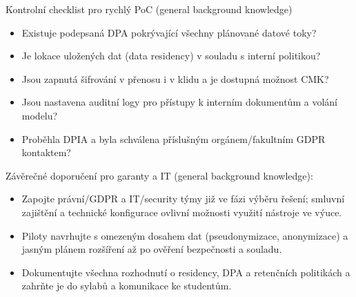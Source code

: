 Kontrolní checklist pro rychlý PoC (general background knowledge)
\begin{itemize}
  \item Existuje podepsaná DPA pokrývající všechny plánované datové toky?
  \item Je lokace uložených dat (data residency) v souladu s interní politikou?
  \item Jsou zapnutá šifrování v přenosu i v klidu a je dostupná možnost CMK?
  \item Jsou nastavena auditní logy pro přístupy k interním dokumentům a volání modelu?
  \item Proběhla DPIA a byla schválena příslušným orgánem/fakultním GDPR kontaktem?
\end{itemize}

Závěrečné doporučení pro garanty a IT (general background knowledge):
\begin{itemize}
  \item Zapojte právní/GDPR a IT/security týmy již ve fázi výběru řešení; smluvní zajištění a technické konfigurace ovlivní možnosti využití nástroje ve výuce.
  \item Piloty navrhujte s omezeným dosahem dat (pseudonymizace, anonymizace) a jasným plánem rozšíření až po ověření bezpečnosti a souladu.
  \item Dokumentujte všechna rozhodnutí o residency, DPA a retenčních politikách a zahrňte je do sylabů a komunikace ke studentům.
\end{itemize}